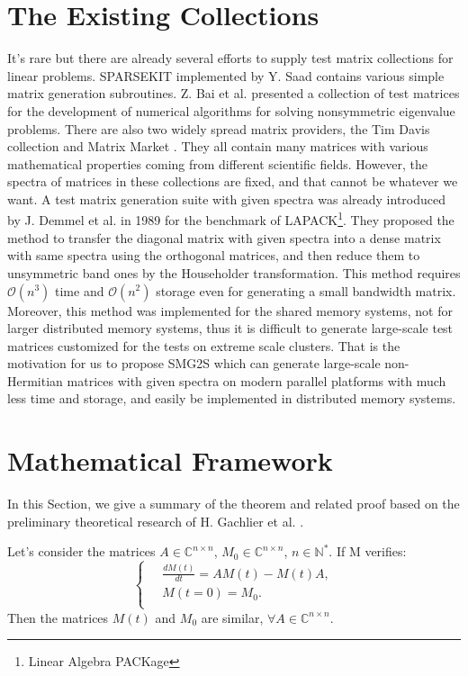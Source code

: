 \section{The Existing Collections} \label{Existing Collections}

It's rare but there are already several efforts to supply test matrix collections for linear problems. SPARSEKIT \cite{saad1994sparsekit} implemented by Y. Saad contains various simple matrix generation subroutines. Z. Bai et al. \cite{bai1996test} presented a collection of test matrices for the development of numerical algorithms for solving nonsymmetric eigenvalue problems. There are also two widely spread matrix providers, the Tim Davis collection \cite{davis2011university} and Matrix Market \cite{boisvert1997matrix}. They all contain many matrices with various mathematical properties coming from different scientific fields. However, the spectra of matrices in these collections are fixed, and that cannot be whatever we want. A test matrix generation suite with given spectra was already introduced by J. Demmel et al.  \cite{demmel1989test} in 1989 for the benchmark of LAPACK\footnote{Linear Algebra PACKage}. They proposed the method to transfer the diagonal matrix with given spectra into a dense matrix with same spectra using the orthogonal matrices, and then reduce them to unsymmetric band ones by the Householder transformation. This method requires $\mathcal{O}(n^3)$ time and $\mathcal{O}(n^2)$ storage even for generating a small bandwidth matrix. Moreover, this method was implemented for the shared memory systems, not for larger distributed memory systems, thus it is difficult to generate large-scale test matrices customized for the tests on extreme scale clusters. That is the motivation for us to propose SMG2S which can generate large-scale non-Hermitian matrices with given spectra on modern parallel platforms with much less time and storage, and easily be implemented in distributed memory systems.

\section{Mathematical Framework}

In this Section, we give a summary of the theorem and related proof based on the preliminary theoretical research of H. Gachlier et al. \cite{galichergenerate}.


\begin{theorem}
	\label{theo1}
	Let's consider the matrices $A \in \mathbb{C}^{n \times n}$, $M_0  \in \mathbb{C}^{n \times n}$, $n \in \mathbb{N}^*$. If M verifies: 
	\[
	\left\{\
	\begin{aligned}
	&\frac{dM(t)}{dt} = AM(t) - M(t)A, \\
	&M(t=0) = M_0. \\ 
	\end{aligned}
	\right.
	\]
	Then the matrices $M(t)$ and $M_0$ are similar, $\forall A \in \mathbb{C}^{n \times n}$. 
\end{theorem}


